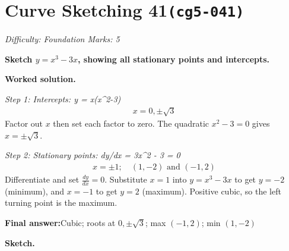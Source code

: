 \documentclass[11pt]{article}
\newcommand{\question}[1]{\par\medskip\noindent\textbf{#1}\par}
\begin{document}
\section*{Curve Sketching 41\quad\small\texttt{(cg5-041)}}
\textit{Difficulty: Foundation \quad\textbar\quad Marks: 5}

\question{Sketch \( y = x^3 - 3x \), showing all stationary points and intercepts.}

\textbf{Worked solution.}

\textit{Step 1: Intercepts: y = x(x\textasciicircum 2-3)}
\[\begin{gathered}
x = 0, \pm\sqrt{3}
\end{gathered}\]
Factor out \( x \) then set each factor to zero. The quadratic \( x^2 - 3 = 0 \) gives \( x = \pm\sqrt{3} \).

\textit{Step 2: Stationary points: dy/dx = 3x\textasciicircum 2 - 3 = 0}
\[\begin{gathered}
x = \pm 1; \quad (1,-2) \text{ and } (-1, 2)
\end{gathered}\]
Differentiate and set \( \tfrac{dy}{dx} = 0 \). Substitute \( x = 1 \) into \( y = x^3 - 3x \) to get \( y = -2 \) (minimum), and \( x = -1 \) to get \( y = 2 \) (maximum). Positive cubic, so the left turning point is the maximum.

\begin{answerbox}
\textbf{Final answer:}\quad Cubic; roots at \(\displaystyle 0, \pm\sqrt{3}\); max \(\displaystyle (-1,2)\); min \(\displaystyle (1,-2)\)
\end{answerbox}
\textbf{Sketch.}
\end{document}
